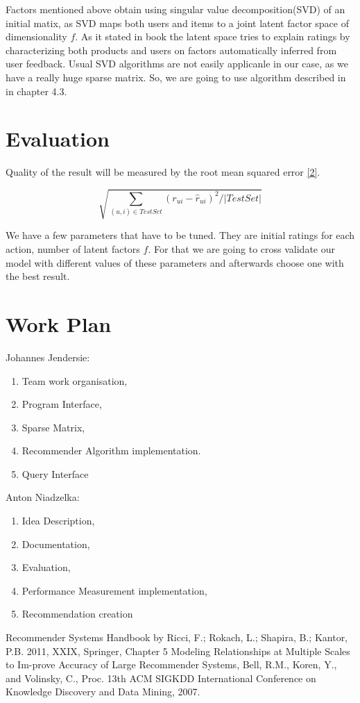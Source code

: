 \documentclass[a4paper,11pt]{article}
\begin{document}
Factors mentioned above obtain using singular value decomposition(SVD) of an initial matix, as SVD maps both users and items to a joint latent factor space of dimensionality $ f $. As it stated in book \cite{1} the latent space tries to explain ratings by characterizing both products and users on factors automatically inferred from user feedback. Usual SVD algorithms are not easily applicanle in our case, as we have a really huge sparse matrix. So, we are going to use algorithm described in \cite{2} in chapter 4.3. 

\section{Evaluation}

Quality of the result will be measured by the root mean squared error \ref{2}.
 
\begin{equation} \label{2} \sqrt{ \sum_{(u,i) \in TestSet} (r_{u i} - \hat{r}_{u i} ) ^2 / \left| TestSet \right| } \end{equation}

We have a few parameters that have to be tuned. They are initial ratings for each action, number of latent factors $ f $. For that we are going to cross validate our model with different values of these parameters and afterwards choose one with the best result. 

\section{Work Plan}

Johannes Jendersie:

\begin{enumerate}
\item Team work organisation,
\item Program Interface,
\item Sparse Matrix,
\item Recommender Algorithm implementation.
\item Query Interface
\end{enumerate}


Anton Niadzelka:

\begin{enumerate}
\item Idea Description, 
\item Documentation,
\item Evaluation,
\item Performance Measurement implementation,
\item Recommendation creation
\end{enumerate}

\begin{thebibliography}{99}
 Recommender Systems Handbook by Ricci, F.; Rokach, L.; Shapira, B.; Kantor, P.B. 2011, XXIX, Springer,  Chapter 5
  Modeling Relationships at Multiple Scales to Im-prove Accuracy of Large Recommender Systems, Bell, R.M., Koren, Y., and Volinsky, C., Proc. 13th ACM SIGKDD International
Conference on Knowledge Discovery and Data Mining, 2007.
\end{thebibliography}
\nocite{*}


\end{document}
